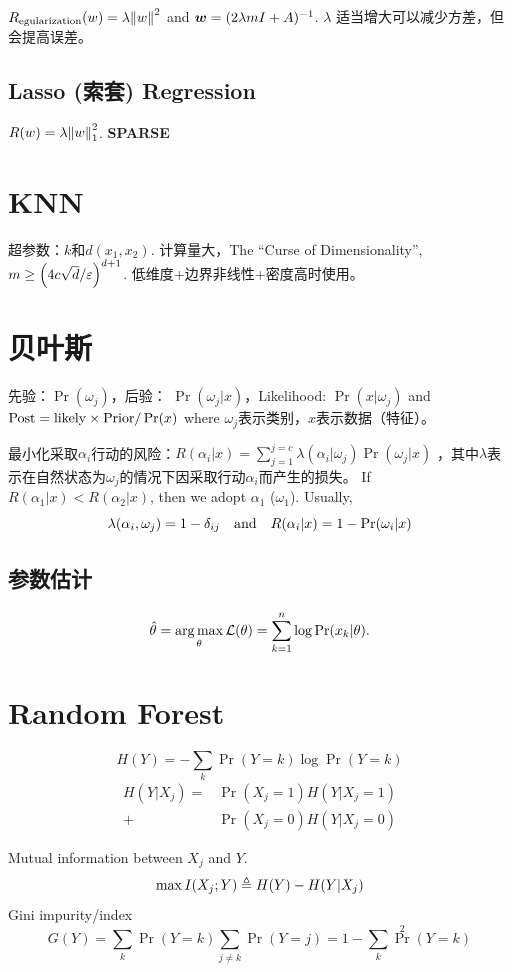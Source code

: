 \documentclass[a4paper,landscape]{article}
\begin{document}
\begin{tiny}
\begin{multicols}{4}
		$R_{\mathrm{egularization}}(w)=\lambda\norm{w}^2$ and $\*w=(2\lambda mI+ A)^{-1}$.
		$\lambda$ 适当增大可以减少方差，但会提高误差。

		\subsection{Lasso (索套) Regression}
		$R(w)=\lambda\norm{w}_1^2$. \textbf{SPARSE}

		\section{KNN}
		超参数：$k$和$d(x_1,x_2)$. 计算量大，The “Curse of Dimensionality”, $m\ge \qty(4c\sqrt{d}/\varepsilon)^{d+1}$. 低维度+边界非线性+密度高时使用。

		\section{贝叶斯}
		先验：$\Pr(\omega_j)$，后验： $\Pr(\omega_j|x)$，Likelihood: $\Pr(x|\omega_j)$ and $\-{Post}=\-{likely}\times\-{Prior}/\Pr(x)$ where $\omega_j$表示类别，$x$表示数据（特征）。

		最小化采取$\alpha_i$行动的风险：$R(\alpha_i|x)=\sum_{j=1}^{j=c}\lambda(\alpha_i|\omega_j)\Pr(\omega_j|x)$ ，其中$\lambda$表示在自然状态为$\omega_j$的情况下因采取行动$\alpha_i$而产生的损失。
		If $R(\alpha_1|x)<R(\alpha_2|x)$, then we adopt $\alpha_1$ ($\omega_1$).
		Usually, \[\lambda(\alpha_i,\omega_j)=1-\delta_{ij} \qand R(\alpha_i|x)=1-\Pr(\omega_i|x)\]

		\subsection{参数估计}
		\[
			\hat{\theta}=\argmax_\theta \+L(\theta)=\sum_{k=1}^n \log\Pr(x_k|\theta)
			.\]

		\section{Random Forest}

		\begin{defi}[Entropy]
			\[
				H(Y)=-\sum_k \Pr(Y=k)\log \Pr(Y=k)
			\]
			\[
				\begin{aligned}
					H(Y|X_j)= & \Pr(X_j=1)H(Y|X_j=1) \\+&\Pr(X_j=0)H(Y|X_j=0)
				\end{aligned}
			\]
		\end{defi}
		Mutual information between  $X_j$ and $Y$.
		\[
			\max I(X_j;Y)
			\defeq
			H(Y)-H(Y|X_j)
		\]
		Gini impurity/index
		\[
			G(Y)=\sum_k \Pr(Y=k)\sum_{j\ne k}\Pr(Y=j)=1-\sum_k\Pr^2(Y=k)
		\]


\end{multicols}
\end{tiny}
\end{document}

